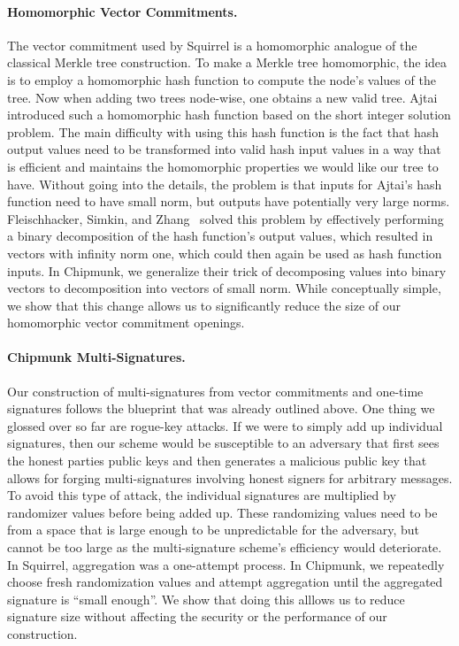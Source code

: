 \paragraph{Homomorphic Vector Commitments.}
The vector commitment used by Squirrel is a homomorphic analogue of the classical Merkle tree construction.
To make a Merkle tree homomorphic, the idea is to employ a homomorphic hash function to compute the node's values of the tree.
Now when adding two trees node-wise, one obtains a new valid tree.
Ajtai~\cite{ICALP:Ajtai99} introduced such a homomorphic hash function based on the short integer solution problem.
The main difficulty with using this hash function is the fact that hash output values need to be transformed into valid hash input values in a way that is efficient and maintains the homomorphic properties we would like our tree to have.
Without going into the details, the problem is that inputs for Ajtai's hash function need to have small norm, but outputs have potentially very large norms.
Fleischhacker, Simkin, and Zhang~\cite{CCS:FleSimZha22} solved this problem by effectively performing a binary decomposition of the hash function's output values, which resulted in vectors with infinity norm one, which could then again be used as hash function inputs.
In Chipmunk, we generalize their trick of decomposing values into binary vectors to decomposition into vectors of small norm.
While conceptually simple, we show that this change allows us to significantly reduce the size of our homomorphic vector commitment openings.

\paragraph{Chipmunk Multi-Signatures.}
Our construction of multi-signatures from vector commitments and one-time signatures follows the blueprint that was already outlined above.
One thing we glossed over so far are rogue-key attacks.
If we were to simply add up individual signatures, then our scheme would be susceptible to an adversary that first sees the honest parties public keys and then generates a malicious public key that allows for forging multi-signatures involving honest signers for arbitrary messages.
To avoid this type of attack, the individual signatures are multiplied by randomizer values before being added up.
These randomizing values need to be from a space that is large enough to be unpredictable for the adversary, but cannot be too large as the multi-signature scheme's efficiency would deteriorate.
In Squirrel, aggregation was a one-attempt process.
In Chipmunk, we repeatedly choose fresh randomization values and attempt aggregation until the aggregated signature is ``small enough''.
We show that doing this alllows us to reduce signature size without affecting the security or the performance of our construction.

